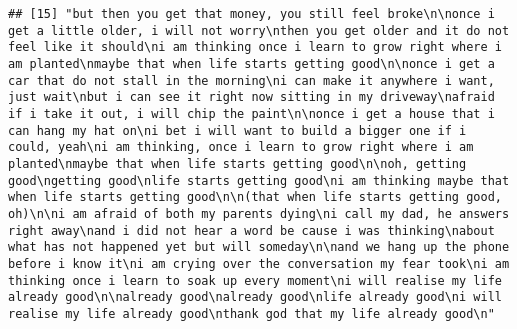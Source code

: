 \documentclass[]{article}
\begin{document}
\begin{verbatim}
## [15] "but then you get that money, you still feel broke\n\nonce i get a little older, i will not worry\nthen you get older and it do not feel like it should\ni am thinking once i learn to grow right where i am planted\nmaybe that when life starts getting good\n\nonce i get a car that do not stall in the morning\ni can make it anywhere i want, just wait\nbut i can see it right now sitting in my driveway\nafraid if i take it out, i will chip the paint\n\nonce i get a house that i can hang my hat on\ni bet i will want to build a bigger one if i could, yeah\ni am thinking, once i learn to grow right where i am planted\nmaybe that when life starts getting good\n\noh, getting good\ngetting good\nlife starts getting good\ni am thinking maybe that when life starts getting good\n\n(that when life starts getting good, oh)\n\ni am afraid of both my parents dying\ni call my dad, he answers right away\nand i did not hear a word be cause i was thinking\nabout what has not happened yet but will someday\n\nand we hang up the phone before i know it\ni am crying over the conversation my fear took\ni am thinking once i learn to soak up every moment\ni will realise my life already good\n\nalready good\nalready good\nlife already good\ni will realise my life already good\nthank god that my life already good\n"                                                                                                                                                                                                                                                                                                                                                                                                                                                                                                                                                                                                                                                                                                                                                                                                                                                                                                                                                                                                                                                                                                                                                                                                                                                                                                                                                                                                                                                                                                                                                                                                                          

\end{verbatim}
\end{document}

